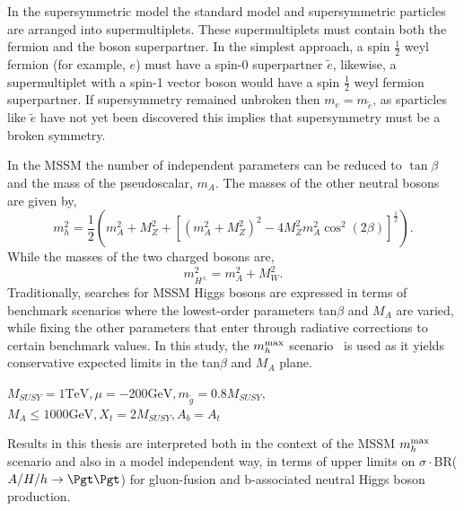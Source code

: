 In the supersymmetric model the standard model and supersymmetric particles are arranged
into supermultiplets. These supermultiplets must contain both the fermion
and the boson superpartner. In the simplest approach, a  spin $\frac{1}{2}$
weyl fermion (for example, $e$) must have %
a spin-0 superpartner $\tilde{e}$, likewise, a supermultiplet with a spin-1 vector boson would have
 a spin $\frac{1}{2}$ weyl fermion superpartner.
 If supersymmetry remained unbroken
then $m_{e}=m_{\tilde{e}}$, as sparticles like $\tilde{e}$ have not 
yet been discovered this implies that supersymmetry must be a broken
symmetry.

In the MSSM the number of independent parameters can be reduced to 
$\tan{\beta}$ and the mass of the pseudoscalar, $m_{A}$. The masses of the other
neutral bosons are given by,
\begin{equation}
m_{h}^{2}=\frac{1}{2}\left(m_{A}^{2}+M_{Z}^{2}+\left[(m_{A}^{2}+
M_{Z}^{2})^{2}-4M_{Z}^{2}m_{A}^{2}\cos^{2}{(2\beta)}\right]^{\frac{1}{2}}\right).
\end{equation}
While the masses of the two charged bosons are,
\begin{equation}
m_{H^{\pm}}^{2}=m_{A}^{2}+M_{W}^{2}.
\end{equation}
Traditionally, searches for MSSM Higgs bosons are expressed in terms of benchmark scenarios where 
the lowest-order parameters tan$\beta$ and $M_A$ are varied, while fixing the other parameters that 
enter through radiative corrections to certain benchmark values. 
In this study, the $m_{h}^{\rm max}$ scenario~\cite{MHMAX-Carena,MHMAX-Carena-2002} is used as it 
yields conservative expected limits in the tan$\beta$ and $M_A$ plane. \\
\linebreak[4]
\begin{center}
$
M_{SUSY} = 1 \mathrm{TeV},
\mu=-200 \mathrm{GeV},
m_{\tilde{g}}=0.8 M_{SUSY}, $
\linebreak[4]
$
M_{A} \leq 1000 \mathrm{GeV},
X_{t}=2M_{SUSY},
A_{b} = A_{t}
$
\end{center}
Results in this thesis are interpreted both in the context of the MSSM 
$m_{h}^{\rm max}$ scenario and also in a model independent way, 
in terms of upper limits on $\sigma\cdot$BR($A\slash H\slash h\rightarrow\Pgt\Pgt$) for 
gluon-fusion and b-associated neutral Higgs boson production.

